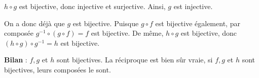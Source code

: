 {{	$h\circ g$ est bijective, donc injective et surjective. Ainsi, $g$ est injective.

	On a donc déjà que $g$ est bijective. Puisque $g\circ f$ est bijective également, par composée $g^{-1} \circ (g\circ f)=f$ est bijective. De même, $h\circ g$ est bijective, donc $(h\circ g)\circ g^{-1} = h$ est bijective.

	\textbf{Bilan} : $f, g$ et $h$ sont bijectives. La réciproque est bien sûr vraie, si $f, g$ et $h$ sont bijectives, leurs composées le sont.
}
}

